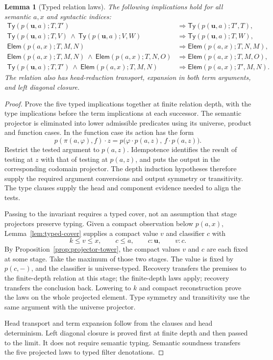 \documentclass[11pt,a4paper]{article}
\newtheorem{lemma}[theorem]{Lemma}
\theoremstyle{definition}
\theoremstyle{remark}
\newcommand{\TyRel}{\mathsf{Ty}}
\newcommand{\ElemRel}{\mathsf{Elem}}
\newcommand{\appl}{\mathbin{\cdot}}
\begin{document}
\begin{lemma}[Typed relation laws]\label{lem:typed-laws}
The following implications hold for all semantic $a,x$ and syntactic
indices:
\begin{align*}
 \TyRel(p(\mathbf u,a);T,T')
  &\Longrightarrow\TyRel(p(\mathbf u,a);T',T),\\
 \TyRel(p(\mathbf u,a);T,V)\ \wedge\
 \TyRel(p(\mathbf u,a);V,W)
  &\Longrightarrow\TyRel(p(\mathbf u,a);T,W),\\
 \ElemRel(p(a,x);T,M,N)
  &\Longrightarrow\ElemRel(p(a,x);T,N,M),\\
 \ElemRel(p(a,x);T,M,N)\ \wedge\
 \ElemRel(p(a,x);T,N,O)
  &\Longrightarrow\ElemRel(p(a,x);T,M,O),\\
 \TyRel(p(\mathbf u,a);T,T')\ \wedge\
 \ElemRel(p(a,x);T,M,N)
  &\Longrightarrow\ElemRel(p(a,x);T',M,N).
\end{align*}
The relation also has head-reduction transport, expansion in both term
arguments, and left diagonal closure.
\end{lemma}
\begin{proof}
Prove the five typed implications together at finite relation depth,
with the type implications before the term implications at each
successor. The semantic projector is eliminated into lower admissible
predicates using its universe, product and function cases. In the
function case its action has the form
\[
 p(\pi(a,\varphi),f)\appl z
  =p\bigl(\varphi\appl p(a,z),\,f\appl p(a,z)\bigr).
\]
Restrict the tested argument to $p(a,z)$. Idempotence identifies the
result of testing at $z$ with that of testing at $p(a,z)$, and puts
the output in the corresponding codomain projector. The depth induction
hypotheses therefore supply the required argument conversions and output
symmetry or transitivity. The type clauses supply the head and component
evidence needed to align the tests.

Passing to the invariant requires a typed cover, not an assumption that
stage projectors preserve typing. Given a compact observation below
$p(a,x)$, Lemma~\ref{lem:typed-cover} supplies a compact value $v$
and classifier $c$ with
\[
 k\leq v\leq x,\qquad c\leq a,\qquad
 c:\mathbf u,\qquad v:c.
\]
By Proposition~\ref{prop:projector-tower}, the compact values $v$ and $c$
are each fixed at some stage. Take the maximum of those two stages.
The value is fixed by $p(c,-)$, and the classifier is universe-typed.
Recovery transfers the premises to the finite-depth relation at this
stage; the finite-depth laws apply; recovery transfers the conclusion
back. Lowering to $k$ and compact reconstruction prove the laws on the
whole projected element. Type symmetry and transitivity use the same
argument with the universe projector.

Head transport and term expansion follow from the clauses and head
determinism. Left diagonal closure is proved first at finite depth and
then passed to the limit. It does not require semantic typing. Semantic
soundness transfers the five projected laws to typed filter denotations.
\end{proof}
\end{document}
